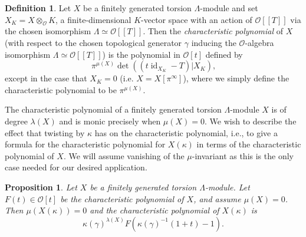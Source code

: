 \documentclass[12 pt]{amsart}
\theoremstyle{plain}
\newtheorem{prop}[thm]{Proposition}
\theoremstyle{definition}
\newtheorem{defn}[thm]{Definition}
\numberwithin{equation}{section}
\numberwithin{table}{section}
\begin{document}
\begin{defn}
\label{char-poly-defn}
Let $X$ be a finitely generated torsion $\Lambda$-module and set $X_K=X\otimes_\mathscr{O}K$, a finite-dimensional $K$-vector space with an action of $\mathscr{O}[[T]]$ via the chosen isomorphism $\Lambda\simeq\mathscr{O}[[T]]$. Then the \emph{characteristic polynomial} of $X$ (with respect to the chosen topological generator $\gamma$ inducing the $\mathscr{O}$-algebra isomorphism $\Lambda\simeq\mathscr{O}[[T]]$) is the polynomial in $\mathscr{O}[t]$ defined by
\begin{equation*}
\pi^{\mu(X)}\det((t\operatorname{id}_{X_K}-T)\vert X_K)\text{,}
\end{equation*}
except in the case that $X_K=0$ (i.e. $X=X[\pi^\infty]$), where we simply define the characteristic polynomial to be $\pi^{\mu(X)}$.
\end{defn}
\indent The characteristic polynomial of a finitely generated torsion $\Lambda$-module $X$ is of degree $\lambda(X)$ and is monic precisely when $\mu(X)=0$. We wish to describe the effect that twisting by $\kappa$ has on the characteristic polynomial, i.e., to give a formula for the characteristic polynomial for $X(\kappa)$ in terms of the characteristic polynomial of $X$. We will assume vanishing of the $\mu$-invariant as this is the only case needed for our desired application.
\begin{prop}
\label{char-poly-twist}
Let $X$ be a finitely generated torsion $\Lambda$-module. Let $F(t)\in\mathscr{O}[t]$ be the characteristic polynomial of $X$, and assume $\mu(X)=0$. Then $\mu(X(\kappa))=0$ and the characteristic polynomial of $X(\kappa)$ is 
\begin{equation*}
\kappa(\gamma)^{\lambda(X)}F(\kappa(\gamma)^{-1}(1+t)-1)\text{.}
\end{equation*}
\end{prop}
\end{document}
